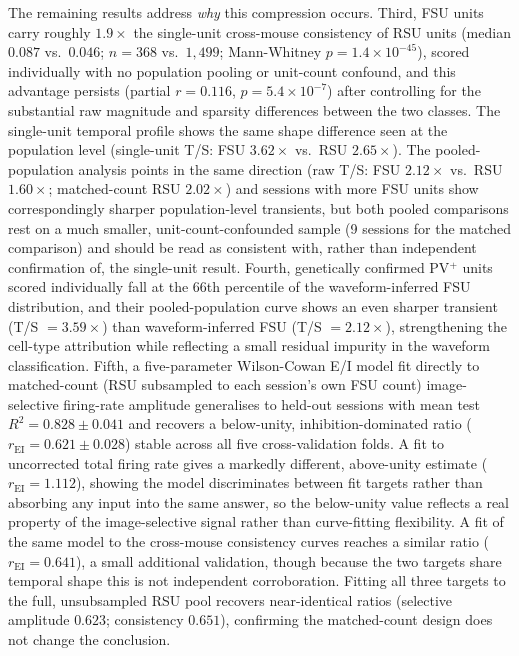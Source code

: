 \documentclass[11pt,onecolumn]{article}
\begin{document}
The remaining results address \textit{why} this compression occurs.
Third, FSU units carry roughly $1.9\times$ the single-unit cross-mouse
consistency of RSU units (median $0.087$ vs.\ $0.046$; $n = 368$ vs.\
$1{,}499$; Mann-Whitney $p = 1.4\times10^{-45}$), scored individually with
no population pooling or unit-count confound, and this advantage persists
(partial $r = 0.116$, $p = 5.4\times10^{-7}$) after controlling for the
substantial raw magnitude and sparsity differences between the two
classes.  The single-unit temporal profile shows the same shape
difference seen at the population level (single-unit T/S: FSU
$3.62\times$ vs.\ RSU $2.65\times$).  The pooled-population analysis
points in the same direction (raw T/S: FSU $2.12\times$ vs.\ RSU
$1.60\times$; matched-count RSU $2.02\times$) and sessions with more FSU
units show correspondingly sharper population-level transients, but both
pooled comparisons rest on a much smaller, unit-count-confounded sample
(9 sessions for the matched comparison) and should be read as consistent
with, rather than independent confirmation of, the single-unit result.
Fourth, genetically confirmed PV$^+$ units scored individually fall at the
66th percentile of the waveform-inferred FSU distribution, and their
pooled-population curve shows an even sharper transient (T/S
$= 3.59\times$) than waveform-inferred FSU (T/S $= 2.12\times$),
strengthening the cell-type attribution while reflecting a small residual
impurity in the waveform classification.  Fifth, a
five-parameter Wilson-Cowan E/I model fit directly to matched-count
(RSU subsampled to each session's own FSU count) image-selective
firing-rate amplitude generalises to held-out sessions with mean test
$R^2 = 0.828 \pm 0.041$ and recovers a below-unity, inhibition-dominated
ratio ($r_\mathrm{EI} = 0.621 \pm 0.028$) stable across all five
cross-validation folds.  A fit to uncorrected total firing rate gives a
markedly different, above-unity estimate ($r_\mathrm{EI} = 1.112$),
showing the model discriminates between fit targets rather than absorbing
any input into the same answer, so the below-unity value reflects a real
property of the image-selective signal rather than curve-fitting
flexibility.  A fit of the same model to the cross-mouse consistency
curves reaches a similar ratio ($r_\mathrm{EI} = 0.641$), a small
additional validation, though because the two targets share temporal
shape this is not independent corroboration.  Fitting all three targets to
the full, unsubsampled RSU pool recovers near-identical ratios (selective
amplitude $0.623$; consistency $0.651$), confirming the matched-count
design does not change the conclusion.
\end{document}
